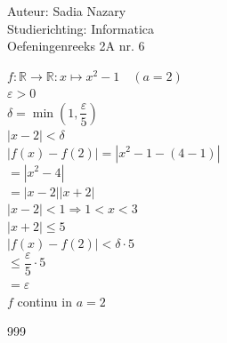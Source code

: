 \documentclass[a4paper]{article}
\newcommand{\R}{\mathbb{R}}
\begin{document}
  
\noindent \large Auteur: Sadia Nazary \\
\noindent \large Studierichting: Informatica\\
\noindent \large Oefeningenreeks 2A nr. 6\\

\medskip

\normalsize

$f:\R\rightarrow\R:x\mapsto x^2 - 1 \quad (a=2)$ \\

$\varepsilon > 0$ \\

$\delta = \min\left(1,\dfrac{\varepsilon}{5}\right)$ \\

$|x-2| < \delta$ \\

$|f(x)-f(2)| = |x^2 - 1 - (4 - 1)|$ \\

$= |x^2 - 4|$ \\

$= |x-2||x+2|$ \\

$|x-2| < 1 \Rightarrow 1 < x < 3$ \\

$|x+2| \le 5$ \\

$|f(x)-f(2)| < \delta \cdot 5$ \\

$\le \dfrac{\varepsilon}{5} \cdot 5$ \\

$= \varepsilon$ \\

$f$ continu in $a=2$ \\

\begin{thebibliography}{999}
\end{thebibliography}
\end{document}
